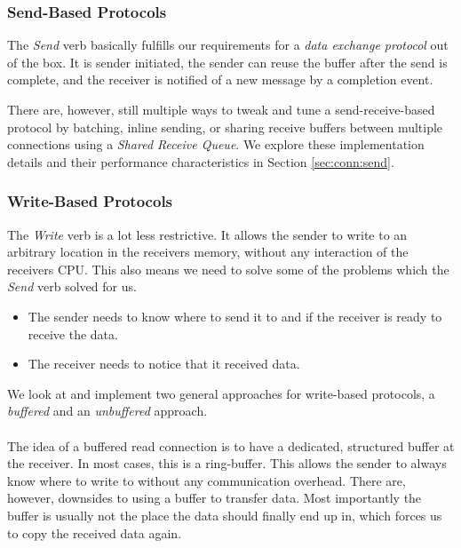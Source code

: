 \subsubsection{Send-Based Protocols}
The \emph{Send} verb basically fulfills our requirements for a \emph{data exchange protocol} out of the box. It is sender
initiated, the sender can reuse the buffer after the send is complete, and the receiver is notified of a new message by
a completion event.

There are, however, still multiple ways to tweak and tune a send-receive-based protocol by batching, inline sending, or 
sharing receive buffers between multiple connections using a \emph{Shared Receive Queue}. We explore these implementation 
details and their performance characteristics in Section \ref{sec:conn:send}.

\subsubsection{Write-Based Protocols}
The \emph{Write} verb is a lot less restrictive. It allows the sender to write to an arbitrary 
location in the receivers memory, without any interaction of the receivers CPU. This also means we need to solve some of the 
problems which the \emph{Send} verb solved for us.

\begin{itemize}
  \item The sender needs to know where to send it to and if the receiver is ready to receive the data.

  \item The receiver needs to notice that it received data.
\end{itemize}

We look at and implement two general approaches for write-based protocols, a \emph{buffered} and an \emph{unbuffered} approach.

\paragraph{} The idea of a buffered read connection is to have a dedicated, structured buffer at the receiver. In most cases, 
this is a ring-buffer. This allows the sender to always know where to write to without any communication overhead. There 
are, however, downsides to using a buffer to transfer data. Most importantly the buffer is usually not the place the 
data should finally end up in, which forces us to copy the received data again.

